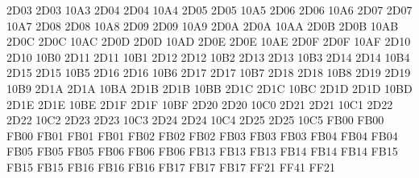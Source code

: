 \setcclcuc 2D03 2D03 10A3 %
\setcclcuc 2D04 2D04 10A4 %
\setcclcuc 2D05 2D05 10A5 %
\setcclcuc 2D06 2D06 10A6 %
\setcclcuc 2D07 2D07 10A7 %
\setcclcuc 2D08 2D08 10A8 %
\setcclcuc 2D09 2D09 10A9 %
\setcclcuc 2D0A 2D0A 10AA %
\setcclcuc 2D0B 2D0B 10AB %
\setcclcuc 2D0C 2D0C 10AC %
\setcclcuc 2D0D 2D0D 10AD %
\setcclcuc 2D0E 2D0E 10AE %
\setcclcuc 2D0F 2D0F 10AF %
\setcclcuc 2D10 2D10 10B0 %
\setcclcuc 2D11 2D11 10B1 %
\setcclcuc 2D12 2D12 10B2 %
\setcclcuc 2D13 2D13 10B3 %
\setcclcuc 2D14 2D14 10B4 %
\setcclcuc 2D15 2D15 10B5 %
\setcclcuc 2D16 2D16 10B6 %
\setcclcuc 2D17 2D17 10B7 %
\setcclcuc 2D18 2D18 10B8 %
\setcclcuc 2D19 2D19 10B9 %
\setcclcuc 2D1A 2D1A 10BA %
\setcclcuc 2D1B 2D1B 10BB %
\setcclcuc 2D1C 2D1C 10BC %
\setcclcuc 2D1D 2D1D 10BD %
\setcclcuc 2D1E 2D1E 10BE %
\setcclcuc 2D1F 2D1F 10BF %
\setcclcuc 2D20 2D20 10C0 %
\setcclcuc 2D21 2D21 10C1 %
\setcclcuc 2D22 2D22 10C2 %
\setcclcuc 2D23 2D23 10C3 %
\setcclcuc 2D24 2D24 10C4 %
\setcclcuc 2D25 2D25 10C5 %
\setcclcuc FB00 FB00 FB00 %
\setcclcuc FB01 FB01 FB01 %
\setcclcuc FB02 FB02 FB02 %
\setcclcuc FB03 FB03 FB03 %
\setcclcuc FB04 FB04 FB04 %
\setcclcuc FB05 FB05 FB05 %
\setcclcuc FB06 FB06 FB06 %
\setcclcuc FB13 FB13 FB13 %
\setcclcuc FB14 FB14 FB14 %
\setcclcuc FB15 FB15 FB15 %
\setcclcuc FB16 FB16 FB16 %
\setcclcuc FB17 FB17 FB17 %
\setcclcuc FF21 FF41 FF21 %
